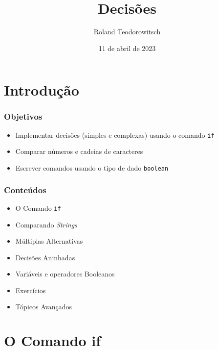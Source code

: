 \documentclass[xcolor={dvipsnames,table},aspectratio=169]{beamer}
\title[\sc{Decisões}]{Decisões}
\author[Roland Teodorowitsch]{Roland Teodorowitsch}
\institute[FPROG - EP - PUCRS]{Fundamentos de Programação - Escola Politécnica - PUCRS}
\date{11 de abril de 2023}
\begin{document}
\justifying

\begin{frame}
	\titlepage
\end{frame}

\section{Introdução}

\begin{frame}\frametitle{Objetivos}
\begin{itemize}
	\item Implementar decisões (simples e complexas) usando o comando \texttt{if}
	\item Comparar números e cadeias de caracteres
	\item Escrever comandos usando o tipo de dado \texttt{boolean}
\end{itemize}
\end{frame}

\begin{frame}\frametitle{Conteúdos}
\begin{itemize}
	\item O Comando \texttt{if}
	\item Comparando \emph{Strings}
	\item Múltiplas Alternativas
	\item Decisões Aninhadas
	\item Variáveis e operadores Booleanos
	\item Exercícios
	\item Tópicos Avançados
\end{itemize}
\end{frame}

\section{O Comando if}
\end{document}
